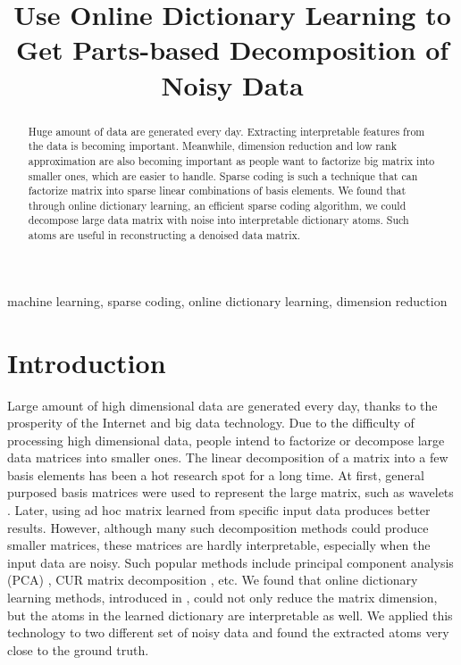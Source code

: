 \documentclass[conference]{IEEEtran}
\begin{document}
\title{Use Online Dictionary Learning to Get Parts-based Decomposition of Noisy Data}

\author{
}

\maketitle

\begin{abstract}
Huge amount of data are generated every day. Extracting interpretable features from the data is becoming important. Meanwhile, dimension reduction and low rank approximation are also becoming important as people want to factorize big matrix into smaller ones, which are easier to handle. Sparse coding is such a technique that can factorize matrix into sparse linear combinations of basis elements. We found that through online dictionary learning, an efficient sparse coding algorithm, we could decompose large data matrix with noise into interpretable dictionary atoms. Such atoms are useful in reconstructing a denoised data matrix.
\end{abstract}

\begin{IEEEkeywords}
machine learning, sparse coding, online dictionary learning, dimension reduction
\end{IEEEkeywords}

\section{Introduction}
Large amount of high dimensional data are generated every day, thanks to the prosperity of the Internet and big data technology. Due to the difficulty of processing high dimensional data, people intend to factorize or decompose large data matrices into smaller ones. The linear decomposition of a matrix into a few basis elements has been a hot research spot for a long time. At first, general purposed basis matrices were used to represent the large matrix, such as wavelets \cite{b1}. Later, using ad hoc matrix learned from specific input data produces better results. However, although many such decomposition methods could produce smaller matrices, these matrices are hardly interpretable, especially when the input data are noisy. Such popular methods include principal component analysis (PCA) \cite{b2}, CUR matrix decomposition \cite{b3}, etc. We found that online dictionary learning methods, introduced in \cite{b4}, could not only reduce the matrix dimension, but the atoms in the learned dictionary are interpretable as well. We applied this technology to two different set of noisy data and found the extracted atoms very close to the ground truth.
\end{document}
